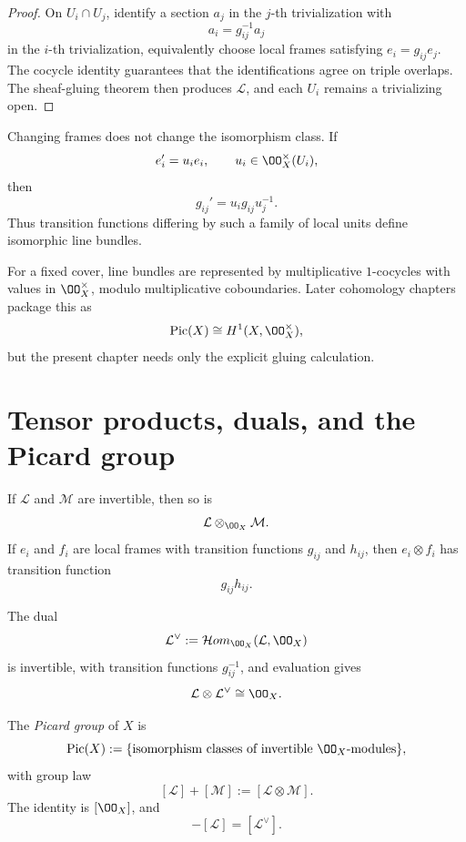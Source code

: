 \begin{proof}
On \(U_i\cap U_j\), identify a section \(a_j\) in the \(j\)-th trivialization with
\[
  a_i=g_{ij}^{-1}a_j
\]
in the \(i\)-th trivialization, equivalently choose local frames satisfying \(e_i=g_{ij}e_j\).  The cocycle identity guarantees that the identifications agree on triple overlaps.  The sheaf-gluing theorem then produces \(\mathcal L\), and each \(U_i\) remains a trivializing open.
\end{proof}

Changing frames does not change the isomorphism class.  If
\[
  e_i'=u_i e_i,\qquad u_i\in\OO_X^\times(U_i),
\]
then
\[
  g_{ij}'=u_i g_{ij}u_j^{-1}.
\]
Thus transition functions differing by such a family of local units define isomorphic line bundles.



\begin{remark}
For a fixed cover, line bundles are represented by multiplicative \(1\)-cocycles with values in \(\OO_X^\times\), modulo multiplicative coboundaries.  Later cohomology chapters package this as
\[
  \Pic(X)\cong H^1(X,\OO_X^\times),
\]
but the present chapter needs only the explicit gluing calculation.
\end{remark}

\section{Tensor products, duals, and the Picard group}

If \(\mathcal L\) and \(\mathcal M\) are invertible, then so is
\[
  \mathcal L\otimes_{\OO_X}\mathcal M.
\]
If \(e_i\) and \(f_i\) are local frames with transition functions \(g_{ij}\) and \(h_{ij}\), then \(e_i\otimes f_i\) has transition function
\[
  g_{ij}h_{ij}.
\]

The dual
\[
  \mathcal L^\vee
  :=
  \mathcal{H}om_{\OO_X}(\mathcal L,\OO_X)
\]
is invertible, with transition functions \(g_{ij}^{-1}\), and evaluation gives
\[
  \mathcal L\otimes\mathcal L^\vee\cong\OO_X.
\]

\begin{definition}\label{def:vi42-picard-group}
The \emph{Picard group} of \(X\) is
\[
  \Pic(X)
  :=
  \{\text{isomorphism classes of invertible }\OO_X\text{-modules}\},
\]
with group law
\[
  [\mathcal L]+[\mathcal M]
  :=
  [\mathcal L\otimes\mathcal M].
\]
The identity is \([\OO_X]\), and
\[
  -[\mathcal L]=[\mathcal L^\vee].
\]
\end{definition}

